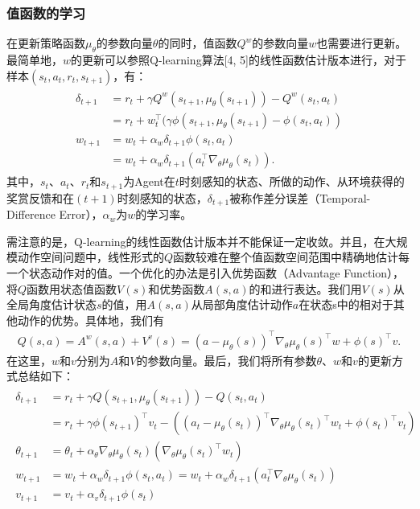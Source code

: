 \subsubsection{值函数的学习}
在更新策略函数$\mu_{\theta}$的参数向量$\theta$的同时，值函数$Q^w$的参数向量$w$也需要进行更新。最简单地，$w$的更新可以参照Q-learning算法[4, 5]的线性函数估计版本进行，对于样本$(s_t, a_t, r_t, s_{t+1})$，有：
\begin{align}
 \begin{split} \delta_{t+1} &= r_t + \gamma Q^w(s_{t+1}, \mu_{\theta}(s_{t+1})) - Q^w(s_t, a_t) \\ &= r_t + w_t^{\top} (\gamma \phi(s_{t+1}, \mu_{\theta}(s_{t+1}) - \phi(s_t, a_t) ) \\ w_{t+1} &= w_t + \alpha_w \delta_{t+1} \phi(s_t, a_t) \\ &= w_t + \alpha_w \delta_{t+1} (a_t^{\top} \nabla_{\theta} \mu_{\theta}(s_t) ). \end{split} 
\end{align}
 其中，$s_t$、$a_t$、$r_t$和$s_{t+1}$为Agent在$t$时刻感知的状态、所做的动作、从环境获得的奖赏反馈和在$(t+1)$时刻感知的状态，$\delta_{t+1}$被称作差分误差（Temporal-Difference Error），$\alpha_w$为$w$的学习率。

需注意的是，Q-learning的线性函数估计版本并不能保证一定收敛。并且，在大规模动作空间问题中，线性形式的$Q$函数较难在整个值函数空间范围中精确地估计每一个状态动作对的值。一个优化的办法是引入优势函数（Advantage Function），将$Q$函数用状态值函数$V(s)$和优势函数$A(s, a)$的和进行表达。我们用$V(s)$从全局角度估计状态$s$的值，用$A(s, a)$从局部角度估计动作$a$在状态s中的相对于其他动作的优势。具体地，我们有
\begin{align}
 Q(s,a) = A^w(s,a) + V^v(s) = (a-\mu_{\theta}(s))^{\top} \nabla_{\theta} \mu_{\theta}(s)^{\top} w + \phi(s)^{\top} v. 
\end{align}
 在这里，$w$和$v$分别为$A$和$V$的参数向量。最后，我们将所有参数$\theta$、$w$和$v$的更新方式总结如下：
\begin{align}
 \begin{split} \delta_{t+1} &= r_t + \gamma Q(s_{t+1}, \mu_{\theta}(s_{t+1})) - Q(s_t, a_t) \\ &= r_t + \gamma \phi(s_{t+1})^{\top} v_t - ( (a_t - \mu_{\theta}(s_t))^{\top} \nabla_{\theta} \mu_{\theta}(s_t)^{\top} w_t + \phi(s_t)^{\top} v_t ) \\ \theta_{t+1} &= \theta_t + \alpha_{\theta} \nabla_{\theta} \mu_{\theta}(s_t) (\nabla_{\theta} \mu_{\theta}(s_t)^{\top} w_t) \\  w_{t+1} &= w_t + \alpha_w \delta_{t+1} \phi(s_t,a_t) = w_t + \alpha_w \delta_{t+1} (a_t^{\top} \nabla_{\theta} \mu_{\theta}(s_t)) \\ v_{t+1} &= v_t + \alpha_v \delta_{t+1} \phi(s_t) \end{split} 
\end{align}



